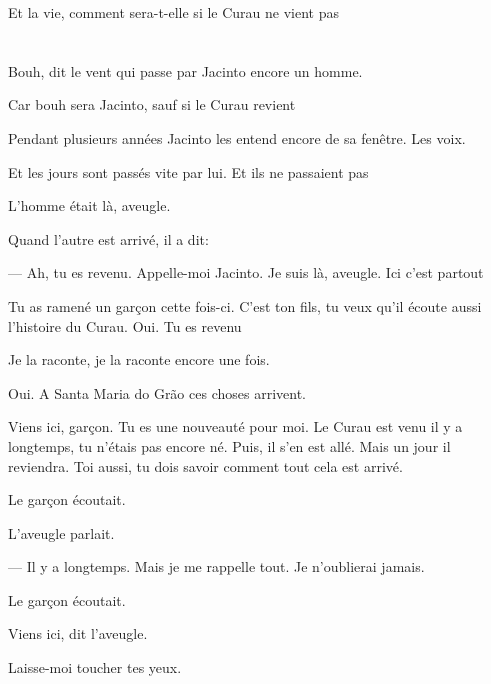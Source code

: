 Et la vie, comment sera-t-elle si le Curau ne vient pas

\breakk
\pagecolor{black}

\chapter*{}
\pagecolor{black}\afterpage{\nopagecolor}


\movetoevenpage

\vspace*{4cm}

Bouh, dit le vent qui passe par Jacinto encore un homme.

Car bouh sera Jacinto, sauf si le Curau revient

\breakk

\vspace*{4cm}

Pendant plusieurs années Jacinto les entend encore de sa fenêtre. Les
voix.

Et les jours sont passés vite par lui. Et ils ne passaient pas

\clearpage
\thispagestyle{empty}
\movetooddpage

\vspace*{4cm}

L'homme était là, aveugle.

Quand l'autre est arrivé, il a dit:

--- Ah, tu es revenu. Appelle-moi Jacinto. Je suis là, aveugle. Ici c'est
  partout

Tu as ramené un garçon cette fois-ci. C'est ton fils, tu veux qu'il
écoute aussi l'histoire du Curau. Oui. Tu es revenu

Je la raconte, je la raconte encore une fois.

Oui. A Santa Maria do Grão ces choses arrivent.

Viens ici, garçon. Tu es une nouveauté pour moi. Le Curau est venu il y
a longtemps, tu n'étais pas encore né. Puis, il s'en est allé. Mais un
jour il reviendra. Toi aussi, tu dois savoir comment tout cela est
arrivé.

Le garçon écoutait.

L'aveugle parlait.

--- Il y a longtemps. Mais je me rappelle tout. Je n'oublierai jamais.

Le garçon écoutait.

Viens ici, dit l'aveugle.

Laisse-moi toucher tes yeux.

